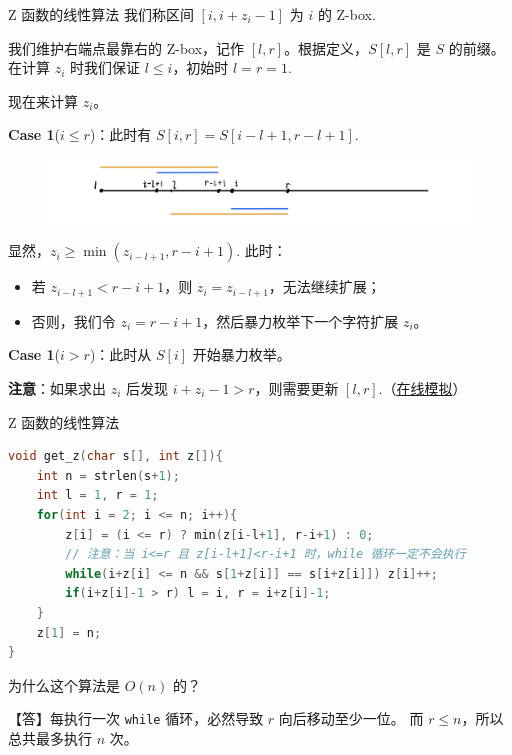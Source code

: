 \documentclass{beamer}
\begin{document}
\begin{frame}[fragile]{Z 函数的线性算法}
    \footnotesize
    我们称区间 $[i,i+z_i-1]$ 为 $i$ 的 Z-box.

    \vspace{1em}\pause
    我们维护右端点最靠右的 Z-box，记作 $[l,r]$。根据定义，$S[l,r]$ 是 $S$ 的前缀。
    在计算 $z_i$ 时我们保证 $l\leq i$，初始时 $l=r=1$.

    \vspace{1em}
    现在来计算 $z_i$。

    \pause\vspace{.5em}\textbf{Case 1}($i\leq r$)：此时有 $S[i,r]=S[i-l+1,r-l+1]$.
    \begin{figure}[H]
        \centering
        \includegraphics[width=\textwidth]{pic/exkmp-1.jpg}
    \end{figure}

    显然，$z_i\geq \min(z_{i-l+1},r-i+1)$. 此时：
    \begin{itemize}
        \pause \item 若 $z_{i-l+1}<r-i+1$，则 $z_i=z_{i-l+1}$，无法继续扩展；
        \pause \item 否则，我们令 $z_i=r-i+1$，然后暴力枚举下一个字符扩展 $z_i$。
    \end{itemize}

    \pause\vspace{.5em}\textbf{Case 1}($i> r$)：此时从 $S[i]$ 开始暴力枚举。

    \pause\vspace{.5em}\textbf{注意}：如果求出 $z_i$ 后发现 $i+z_i-1>r$，则需要更新 $[l,r]$.（\href{https://personal.utdallas.edu/~besp/demo/John2010/z-algorithm.htm}{在线模拟}）
\end{frame}

\begin{frame}[fragile]{Z 函数的线性算法}
    \small
    \begin{lstlisting}[language=c++]
void get_z(char s[], int z[]){
    int n = strlen(s+1);
    int l = 1, r = 1;
    for(int i = 2; i <= n; i++){
        z[i] = (i <= r) ? min(z[i-l+1], r-i+1) : 0;
        // 注意：当 i<=r 且 z[i-l+1]<r-i+1 时，while 循环一定不会执行
        while(i+z[i] <= n && s[1+z[i]] == s[i+z[i]]) z[i]++;
        if(i+z[i]-1 > r) l = i, r = i+z[i]-1;
    }
    z[1] = n;
}
    \end{lstlisting}

    \vspace{1em}\pause
    为什么这个算法是 $O(n)$ 的？

    \vspace{1em}\pause
    【答】每执行一次 \verb|while| 循环，必然导致 $r$ 向后移动至少一位。
    而 $r\leq n$，所以总共最多执行 $n$ 次。
\end{frame}
\end{document}
